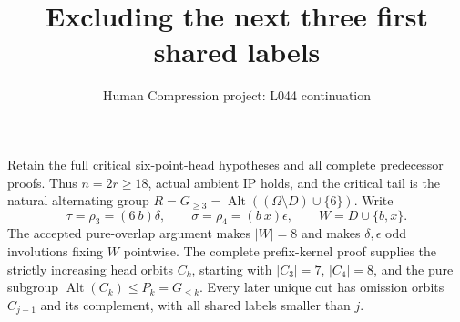 \documentclass[11pt,a4paper]{article}
\title{Excluding the next three first shared labels}
\author{Human Compression project: L044 continuation}
\date{}
\newcommand{\Alt}{\operatorname{Alt}}
\begin{document}
\maketitle
Retain the full critical six-point-head hypotheses and all complete
predecessor proofs. Thus $n=2r\geq18$, actual ambient IP holds,
and the critical tail is the natural alternating group
$R=G_{\geq3}=\Alt((\Omega\setminus D)\cup\{6\})$.
Write
\[
 \tau=\rho_3=(6\ b)\delta,\qquad
 \sigma=\rho_4=(b\ x)\epsilon,\qquad W=D\cup\{b,x\}.
\]
The accepted pure-overlap argument makes $|W|=8$ and makes
$\delta,\epsilon$ odd involutions fixing $W$ pointwise.
The complete prefix-kernel proof supplies the strictly increasing
head orbits $C_k$, starting with $|C_3|=7$, $|C_4|=8$,
and the pure subgroup $\Alt(C_k)\leq P_k=G_{\leq k}$.
Every later unique cut has omission orbits $C_{j-1}$ and its
complement, with all shared labels smaller than $j$.
\end{document}
